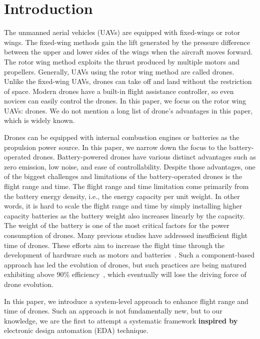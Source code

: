 \documentclass[journal]{./template/IEEEtran}
\begin{document}
\section{Introduction}
\label{Section: introduction}
The unmanned aerial vehicles (UAVs) are equipped with fixed-wings or rotor wings. 
The fixed-wing methods gain the lift generated by the pressure difference between the upper and lower sides of the wings when the aircraft moves forward. 
The rotor wing method exploits the thrust produced by multiple motors and propellers. Generally, UAVs using the rotor wing method are called drones. 
Unlike the fixed-wing UAVs, drones can take off and land without the restriction of space. 
Modern drones have a built-in flight assistance controller, so even novices can easily control the drones. 
In this paper, we focus on the rotor wing UAVs: drones. We do not mention a long list of drone's advantages in this paper, which is widely known. 

Drones can be equipped with internal combustion engines or batteries as the propulsion power source. In this paper, we narrow down the focus to the battery-operated drones.
Battery-powered drones have various distinct advantages such as zero emission, low noise, and ease of controllability.
Despite those advantages, one of the biggest challenges and limitations of the battery-operated drones is the flight range and time. 
The flight range and time limitation come primarily from the battery energy density, i.e., the energy capacity per unit weight.
In other words, it is hard to scale the flight range and time by simply installing higher capacity batteries as the battery weight also increases linearly by the capacity. 
The weight of the battery is one of the most critical factors for the power consumption of drones. 
Many previous studies have addressed insufficient flight time of drones. 
These efforts aim to increase the flight time through the development of hardware such as motors and batteries~\cite{ref_1}.
Such a component-based approach has led the evolution of drones, but such practices are being matured exhibiting above 90\% efficiency~\cite{ref_2}, which eventually will lose the driving force of drone evolution. 

In this paper, we introduce a system-level approach to enhance flight range and time of drones.
Such an approach is not fundamentally new, but to our knowledge, we are the first to attempt a systematic framework \textbf{inspired by} electronic design automation (EDA) technique.
\end{document}

